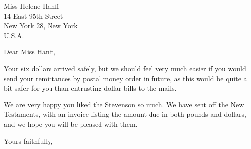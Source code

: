 \documentclass{letter}
\date{9th November, 1949}
\begin{document}
\begin{letter}{Miss Helene Hanff\\14 East 95th Street\\New York 28, New York\\U.S.A.}
\opening{Dear Miss Hanff,}

Your six dollars arrived safely, but we should feel very much easier if you would send your remittances by postal money order in future, as this would be quite a bit safer for you than entrusting dollar bills to the mails.

We are very happy you liked the Stevenson so much. We have sent off the New Testaments, with an invoice listing the amount due in both pounds and dollars, and we hope you will be pleased with them.

\closing{Yours faithfully,}
\end{letter}
\end{document}
